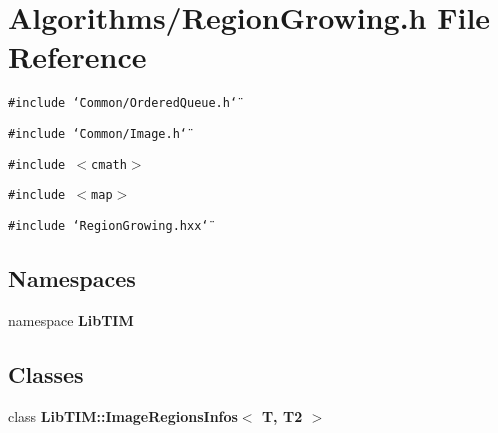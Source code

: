 \section{Algorithms/Region\-Growing.h File Reference}
\label{RegionGrowing_8h}
{\tt \#include \char`\"{}Common/Ordered\-Queue.h\char`\"{}}\par
{\tt \#include \char`\"{}Common/Image.h\char`\"{}}\par
{\tt \#include $<$cmath$>$}\par
{\tt \#include $<$map$>$}\par
{\tt \#include \char`\"{}Region\-Growing.hxx\char`\"{}}\par
\subsection*{Namespaces}
\begin{CompactItemize}
\item 
namespace {\bf Lib\-TIM}
\end{CompactItemize}
\subsection*{Classes}
\begin{CompactItemize}
\item 
class {\bf Lib\-TIM::Image\-Regions\-Infos$<$ T, T2 $>$}
\end{CompactItemize}

